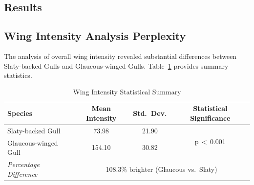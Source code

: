 \documentclass[a4paper,12pt]{report}
\begin{document}




\subsection{Results}

\subsection{Wing Intensity Analysis Perplexity}

The analysis of overall wing intensity revealed substantial differences between Slaty-backed Gulls and Glaucous-winged Gulls. Table~\ref{tab:wingintensity-stats} provides summary statistics.

\begin{table}[H]
    \centering
    \caption{Wing Intensity Statistical Summary}
    \label{tab:wingintensity-stats}
    \begin{tabular}{lccc}
        \toprule
        Species & Mean Intensity & Std.\ Dev. & Statistical Significance \\
        \midrule
        Slaty-backed Gull & 73.98 & 21.90 & \multirow{2}{*}{p\,$<$\,0.001} \\
        Glaucous-winged Gull & 154.10 & 30.82 & \\
        \textit{Percentage Difference} & \multicolumn{3}{c}{108.3\% brighter (Glaucous vs.\ Slaty)} \\
        \bottomrule
    \end{tabular}
\end{table}
\end{document}
